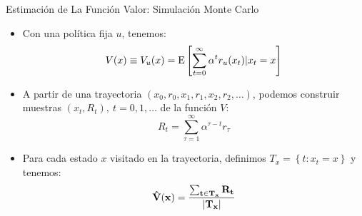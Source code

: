 \documentclass[handout]{beamer}
\begin{document}
\begin{frame}{Estimación de La Función Valor: Simulación Monte Carlo}
\begin{itemize}
\item Con una política fija $u$, tenemos:
$$
V(x) \equiv V_u(x) = {\rm E}\left[\sum_{t=0}^\infty \alpha^t r_u(x_t)|x_t = x\right]
$$
\item<2-> A partir de una trayectoria $(x_0,r_0,x_1,r_1,x_2,r_2,\dots)$, podemos construir muestras $(x_t,R_t),~t=0,1,\dots$ de la función $V$: 
$$
R_t = \sum_{\tau=1}^\infty \alpha^{\tau-t} r_\tau
$$
\item<3-> Para cada estado $x$ visitado en la trayectoria, definimos $T_x = \left\{t: x_t = x\right\}$ y tenemos:
$$
{\bf \hat V(x) = \frac{\sum_{t\in T_x} R_t}{|T_x|}}
$$
\end{itemize}
\end{frame}

\end{document}
